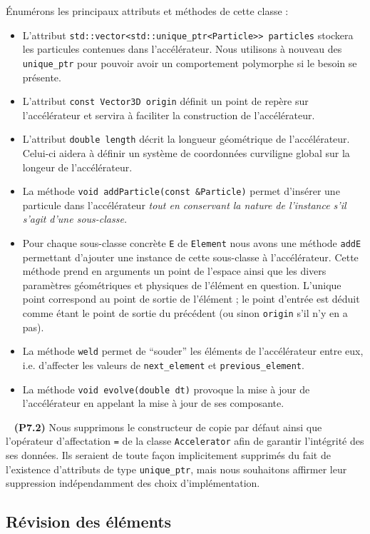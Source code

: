 \documentclass[12pt, letterpaper, twoside]{article}
\newcommand{\T}[1]{\texttt{#1}}
\begin{document}
Énumérons les principaux attributs et méthodes de cette classe :
\begin{itemize}
	\item L'attribut \T{std::vector<std::unique\_ptr<Particle>> particles} stockera les particules contenues dans l'accélérateur. Nous utilisons à nouveau des \T{unique\_ptr} pour pouvoir avoir un comportement polymorphe si le besoin se présente.
	\item L'attribut \T{const Vector3D origin} définit un point de repère sur l'accélérateur et servira à faciliter la construction de l'accélérateur.
	\item L'attribut \T{double length} décrit la longueur géométrique de l'accélérateur. Celui-ci aidera à définir un système de coordonnées curviligne global sur la longeur de l'accélérateur.
	\item La méthode \T{void addParticle(const \&Particle)} permet d'insérer une particule dans l'accélérateur \textit{tout en conservant la nature de l'instance s'il s'agit d'une sous-classe.}
	\item Pour chaque sous-classe concrète \T{E} de \T{Element} nous avons une méthode \T{addE} permettant d'ajouter une instance de cette sous-classe à l'accélérateur. Cette méthode prend en arguments un point de l'espace ainsi que les divers paramètres géométriques et physiques de l'élément en question. L'unique point correspond au point de sortie de l'élément ; le point d'entrée est déduit comme étant le point de sortie du précédent (ou sinon \T{origin} s'il n'y en a pas).
	\item La méthode \T{weld} permet de ``souder'' les éléments de l'accélérateur entre eux, i.e. d'affecter les valeurs de \T{next\_element} et \T{previous\_element}.

	\item La méthode \T{void evolve(double dt)} provoque la mise à jour de l'accélérateur en appelant la mise à jour de ses composante.
\end{itemize}

\ \linebreak
\noindent \textbf{(P7.2)} Nous supprimons le constructeur de copie par défaut ainsi que l'opérateur d'affectation \T{=} de la classe \T{Accelerator} afin de garantir l'intégrité des ses données. Ils seraient de toute façon implicitement supprimés du fait de l'existence d'attributs de type \T{unique\_ptr}, mais nous souhaitons affirmer leur suppression indépendamment des choix d'implémentation.

\subsection{Révision des éléments}
\end{document}
